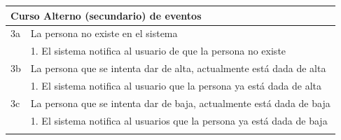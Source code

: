 \begin{table}[hp!]
{\begin{tabular}{|l|l|l|l|}
        \hline
        \multicolumn{4}{|l|}{{\cellcolor[rgb]{0.886,0.886,0.886}}\textbf{Curso Alterno (secundario) de eventos}}                                                                                                                                                                                          \\ 
        \hline
        3a & \multicolumn{3}{l|}{La persona no existe en el sistema}                                                                                                                                                                                                                                      \\ 
        \hline
        & \multicolumn{3}{l|}{1. El sistema notifica al usuario de que la persona no existe}                                                                                                                                                                                                           \\ 
        \hline
        3b & \multicolumn{3}{l|}{La persona que se intenta dar de alta, actualmente está dada de alta}                                                                                                                                                                                                    \\ 
        \hline
        & \multicolumn{3}{l|}{1. El sistema notifica al usuario que la persona ya está dada de alta}                                                                                                                                                                                                   \\ 
        \hline
        3c & \multicolumn{3}{l|}{La persona que se intenta dar de baja, actualmente está dada de baja}                                                                                                                                                                                                    \\ 
        \hline
        & \multicolumn{3}{l|}{1. El sistema notifica al usuarios que la persona ya está dada de baja}                                                                                                                                                                                                  \\ 
        \hline
        \multicolumn{4}{l}{}                                                                                                                                                                                                                                                                              \\ 

\end{tabular}}
\end{table}
